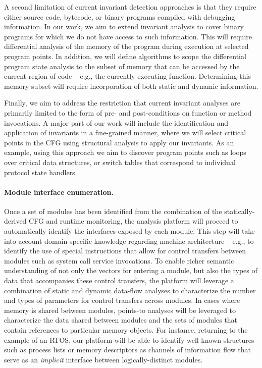 \documentclass[letterpaper,twoside,11pt,headings=small]{scrartcl}
\begin{document}
A second limitation of current invariant detection approaches is that they
require either source code, bytecode, or binary programs compiled with
debugging information.  In our work, we aim to extend invariant analysis to
cover binary programs for which we do not have access to such information.
This will require differential analysis of the memory of the program during
execution at selected program points.  In addition, we will define algorithms
to scope the differential program state analysis to the subset of memory that
can be accessed by the current region of code -- e.g., the currently executing
function.  Determining this memory subset will require incorporation of both
static and dynamic information.

Finally, we aim to address the restriction that current invariant analyses are
primarily limited to the form of pre- and post-conditions on function or
method invocations.  A major part of our work will include the identification
and application of invariants in a fine-grained manner, where we will select
critical points in the CFG using structural analysis to apply our invariants.
As an example, using this approach we aim to discover program points such as
loops over critical data structures, or switch tables that correspond to
individual protocol state handlers

\paragraph{Module interface enumeration.} Once a set of modules has been
identified from the combination of the statically-derived CFG and runtime
monitoring, the analysis platform will proceed to automatically identify the
interfaces exposed by each module.  This step will take into account
domain-specific knowledge regarding machine architecture -- e.g., to identify
the use of special instructions that allow for control transfers between
modules such as system call service invocations.  To enable richer semantic
understanding of not only the vectors for entering a module, but also the
types of data that accompanies these control transfers, the platform will
leverage a combination of static and dynamic data-flow analyses to
characterize the number and types of parameters for control transfers across
modules.  In cases where memory is shared between modules, points-to analyses
will be leveraged to characterize the data shared between modules and the sets
of modules that contain references to particular memory objects.  For
instance, returning to the example of an RTOS, our platform will be able to
identify well-known structures such as process lists or memory descriptors as
channels of information flow that serve as an \emph{implicit} interface
between logically-distinct modules.
\end{document}
